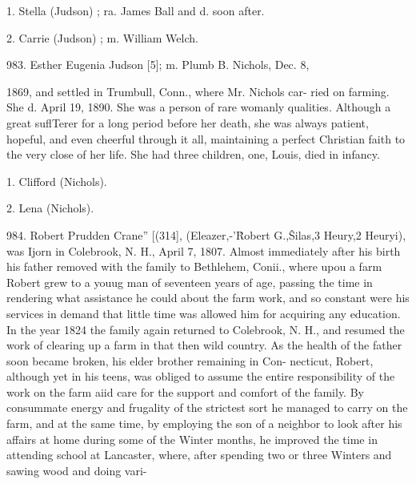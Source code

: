 1. Stella (Judson) ; ra. James Ball and d. soon after. 

2. Carrie (Judson) ; m. William Welch. 

983. Esther Eugenia Judson [5]; m. Plumb B. Nichols, Dec. 8, 

1869, and settled in Trumbull, Conn., where Mr. Nichols car- 
ried on farming. She d. April 19, 1890. She was a person of 
rare womanly qualities. Although a great suflTerer for a long 
period before her death, she was always patient, hopeful, and 
even cheerful through it all, maintaining a perfect Christian 
faith to the very close of her life. She had three children, 
one, Louis, died in infancy. 

1. Clifford (Nichols). 

2. Lena (Nichols). 

984. Robert Prudden Crane'' [(314], (Eleazer,-'\^ Robert G.,\^ 
Silas,3 Heury,2 Heuryi), was Ijorn in Colebrook, N. H., April 7, 
1807. Almost immediately after his birth his father removed 
with the family to Bethlehem, Conii., where upou a farm Robert 
grew to a youug man of seventeen years of age, passing the time 
in rendering what assistance he could about the farm work, and 
so constant were his services in demand that little time was allowed 
him for acquiring any education. In the year 1824 the family 
again returned to Colebrook, N. H., and resumed the work of 
clearing up a farm in that then wild country. As the health of the 
father soon became broken, his elder brother remaining in Con- 
necticut, Robert, although yet in his teens, was obliged to assume 
the entire responsibility of the work on the farm aiid care for the 
support and comfort of the family. By consummate energy and 
frugality of the strictest sort he managed to carry on the farm, 
and at the same time, by employing the son of a neighbor to look 
after his affairs at home during some of the Winter months, he 
improved the time in attending school at Lancaster, where, after 
spending two or three Winters and sawing wood and doing vari- 




